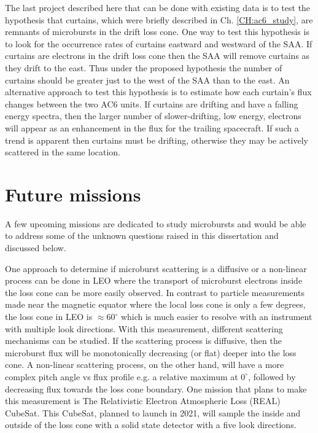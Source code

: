 The last project described here that can be done with existing data is to test the hypothesis that curtains, which were briefly described in Ch. \ref{CH:ac6_study}, are remnants of microbursts in the drift loss cone. One way to test this hypothesis is to look for the occurrence rates of curtains eastward and westward of the SAA. If curtains are electrons in the drift loss cone then the SAA will remove curtains as they drift to the east. Thus under the proposed hypothesis the number of curtains should be greater just to the west of the SAA than to the east. An alternative approach to test this hypothesis is to estimate how each curtain's flux changes between the two AC6 units. If curtains are drifting and have a falling energy spectra, then the larger number of slower-drifting, low energy, electrons will appear as an enhancement in the flux for the trailing spacecraft. If such a trend is apparent then curtains must be drifting, otherwise they may be actively scattered in the same location. 

\section{Future missions}
A few upcoming missions are dedicated to study microbursts and would be able to address some of the unknown questions raised in this dissertation and discussed below.

One approach to determine if microburst scattering is a diffusive or a non-linear process can be done in LEO where the transport of microburst electrons inside the loss cone can be more easily observed. In contrast to particle measurements made near the magnetic equator where the local loss cone is only a few degrees, the loss cone in LEO is $\approx 60^\circ$ which is much easier to resolve with an instrument with multiple look directions. With this measurement, different scattering mechanisms can be studied. If the scattering process is diffusive, then the microburst flux will be monotonically decreasing (or flat) deeper into the loss cone. A non-linear scattering process, on the other hand, will have a more complex pitch angle vs flux profile e.g. a relative maximum at $0^\circ$, followed by decreasing flux towards the loss cone boundary. One mission that plans to make this measurement is The Relativistic Electron Atmospheric Loss (REAL) CubeSat. This CubeSat, planned to launch in 2021, will sample the inside and outside of the loss cone with a solid state detector with a five look directions.

